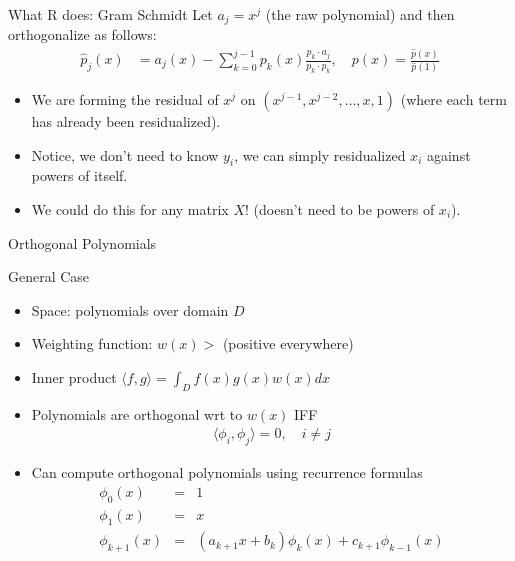 \documentclass[11pt,handout,xcolor=pdftex,dvipsnames,table,mathserif,aspectratio=169]{beamer}
\begin{document}
\begin{frame}{What R does: Gram Schmidt}
Let $a_j = x^j$ (the raw polynomial) and then \alert{orthogonalize} as follows:
\begin{align*}
\hat{p}_{j}(x)&=a_{j}(x)-\sum_{k=0}^{j-1} p_{k}(x) \frac{p_{k} \cdot a_{j}}{p_{k} \cdot p_{k}}, \quad 
p(x)=\frac{\hat{p}(x)}{ \hat{p}(1)}
\end{align*}
\begin{itemize}
\item We are forming the \alert{residual} of $x^j$ on $(x^{j-1}, x^{j-2},\ldots, x, 1)$ (where each term has already been residualized).
\item Notice, we don't need to know $y_i$, we can simply residualized $x_i$ against powers of itself.
\item We could do this for any matrix $X$! (doesn't need to be powers of $x_i$).
\end{itemize}
\end{frame}


\begin{frame}{Orthogonal Polynomials}
\small
\begin{block}{General Case}
\begin{itemize}
\item Space: polynomials over domain $D$
\item Weighting function: $w(x) > $ (positive everywhere)
\item Inner product $\langle f,g \rangle = \int_D f(x) g(x) w(x) d x$
\item Polynomials are orthogonal wrt to $w(x)$ IFF 
\begin{eqnarray*}
\langle \phi_i, \phi_j \rangle = 0, \quad i \neq j
\end{eqnarray*}
\item Can compute orthogonal polynomials using recurrence formulas
\begin{eqnarray*}
\phi_0(x) &=& 1\\
\phi_1(x) &=& x \\
\phi_{k+1}(x) &=& (a_{k+1} x + b_k) \phi_k(x) + c_{k+1} \phi_{k-1}(x)
\end{eqnarray*}
\end{itemize}
\end{block}
\end{frame}
\end{document}
